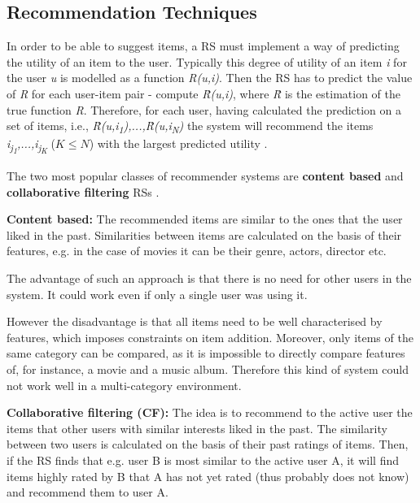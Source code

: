 \documentclass[12pt]{report}
\begin{document}

\subsection{Recommendation Techniques}

In order to be able to suggest items, a RS must implement a way of predicting the utility of an item to the user. Typically this degree of utility of an item \textit{i} for the user \textit{u} is modelled as a function \textit{R(u,i)}. Then the RS has to predict the value of \textit{R} for each user-item pair - compute \textit{\^{R}(u,i)}, where \textit{\^{R}} is the estimation of the true function \textit{R}. Therefore, for each user, having calculated the prediction on a set of items, i.e., \textit{\^{R}(u,i\textsubscript{1}),...,\^{R}(u,i\textsubscript{N})} the system will recommend the items \textit{i\textsubscript{j\textsubscript{1}},...,i\textsubscript{j\textsubscript{K}}} ($K \leq N$) with the largest predicted utility \cite{rec_sys_handbook}.

The two most popular classes of recommender systems are {\bf content based} and {\bf collaborative filtering} RSs \cite{rec_sys_handbook}.

\hbox{}
{\bf Content based:} The recommended items are similar to the ones that the user liked in the past. Similarities between items are calculated on the basis of their features, e.g. in the case of movies it can be their genre, actors, director etc.

The advantage of such an approach is that there is no need for other users in the system. It could work even if only a single user was using it.

However the disadvantage is that all items need to be well characterised by features, which imposes constraints on item addition. Moreover, only items of the same category can be compared, as it is impossible to directly compare features of, for instance, a movie and a music album. Therefore this kind of system could not work well in a multi-category environment.

\hbox{}
{\bf Collaborative filtering (CF):} The idea is to recommend to the active user the items that other users with similar interests liked in the past. The similarity between two users is calculated on the basis of their past ratings of items. Then, if the RS finds that e.g. user B is most similar to the active user A, it will find items highly rated by B that A has not yet rated (thus probably does not know) and recommend them to user A.
\end{document}
